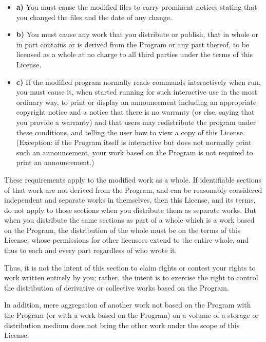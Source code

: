 \begin{itemize}
\item {\bf a)} You must cause the modified files to carry prominent  notices
   stating that you changed the files and the date of any change.  

\item {\bf b)} You must cause any work that you distribute or  publish, that
   in whole or in part contains or is derived from the Program or  any part
   thereof, to be licensed as a whole at no charge to all third parties  under
   the terms of this License.  

\item {\bf c)} If the modified program normally reads commands  interactively
   when run, you must cause it, when started running for such  interactive use in
   the most ordinary way, to print or display an announcement  including an
   appropriate copyright notice and a notice that there is no  warranty (or else,
   saying that you provide a warranty) and that users may  redistribute the
   program under these conditions, and telling the user how to  view a copy of
   this License. (Exception: if the Program itself is interactive  but does not
   normally print such an announcement, your work based on the  Program is not
   required to print an announcement.) 
\end{itemize}

These requirements apply to the modified work as a whole. If identifiable
sections of that work are not derived from the Program, and can be reasonably
considered independent and separate works in themselves, then this License,
and its terms, do not apply to those sections when you distribute them as
separate works. But when you distribute the same sections as part of a whole
which is a work based on the Program, the distribution of the whole must be on
the terms of this License, whose permissions for other licensees extend to the
entire whole, and thus to each and every part regardless of who wrote it. 

Thus, it is not the intent of this section to claim rights or contest your
rights to work written entirely by you; rather, the intent is to exercise the
right to control the distribution of derivative or collective works based on
the Program. 

In addition, mere aggregation of another work not based on the Program with
the Program (or with a work based on the Program) on a volume of a storage or
distribution medium does not bring the other work under the scope of this
License. 

